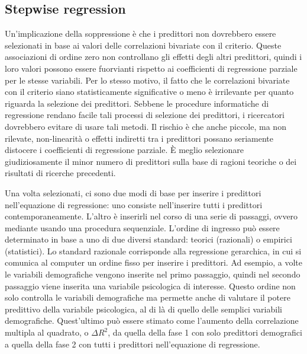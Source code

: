 \documentclass[
  11pt,
]{krantz}
\begin{document}
\hypertarget{stepwise-regression}{%
\subsection{Stepwise regression}\label{stepwise-regression}}

Un'implicazione della soppressione è che i predittori non dovrebbero essere selezionati in base ai valori delle correlazioni bivariate con il criterio. Queste associazioni di ordine zero non controllano gli effetti degli altri predittori, quindi i loro valori possono essere fuorvianti rispetto ai coefficienti di regressione parziale per le stesse variabili. Per lo stesso motivo, il fatto che le correlazioni bivariate con il criterio siano statisticamente significative o meno è irrilevante per quanto riguarda la selezione dei predittori. Sebbene le procedure informatiche di regressione rendano facile tali processi di selezione dei predittori, i ricercatori dovrebbero evitare di usare tali metodi. Il rischio è che anche piccole, ma non rilevate, non-linearità o effetti indiretti tra i predittori possano seriamente distocere i coefficienti di regressione parziale. È meglio selezionare giudiziosamente il minor numero di predittori sulla base di ragioni teoriche o dei risultati di ricerche precedenti.

Una volta selezionati, ci sono due modi di base per inserire i predittori nell'equazione di regressione: uno consiste nell'inserire tutti i predittori contemporaneamente. L'altro è inserirli nel corso di una serie di passaggi, ovvero mediante usando una procedura sequenziale. L'ordine di ingresso può essere determinato in base a uno di due diversi standard: teorici (razionali) o empirici (statistici). Lo standard razionale corrisponde alla regressione gerarchica, in cui si comunica al computer un ordine fisso per inserire i predittori. Ad esempio, a volte le variabili demografiche vengono inserite nel primo passaggio, quindi nel secondo passaggio viene inserita una variabile psicologica di interesse. Questo ordine non solo controlla le variabili demografiche ma permette anche di valutare il potere predittivo della variabile psicologica, al di là di quello delle semplici variabili demografiche. Quest'ultimo può essere stimato come l'aumento della correlazione multipla al quadrato, o \(\Delta R^2\), da quella della fase 1 con solo predittori demografici a quella della fase 2 con tutti i predittori nell'equazione di regressione.
\end{document}
